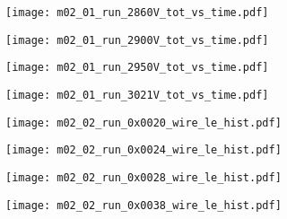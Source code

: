 \documentclass[11pt, ngerman, fleqn, DIV=15, headinclude, BCOR=2cm]{scrreprt}
\begin{document}
\begin{appendix}
	\begin{figure}
		\centering
	\begin{subfigure}[a]{0.45 \textwidth}
		\texttt{[image: m02\_01\_run\_2860V\_tot\_vs\_time.pdf]}
		\caption{%
		}
		\label{fig:m02_01_run_2860V_tot_vs_time}
	\end{subfigure}
	\begin{subfigure}[a]{0.45 \textwidth}
		\texttt{[image: m02\_01\_run\_2900V\_tot\_vs\_time.pdf]}
		\caption{%
		}
		\label{fig:m02_01_run_2900V_tot_vs_time}
	\end{subfigure}
	\begin{subfigure}[a]{0.45 \textwidth}
		\texttt{[image: m02\_01\_run\_2950V\_tot\_vs\_time.pdf]}
		\caption{%
		}
		\label{fig:m02_01_run_2950V_tot_vs_time}
	\end{subfigure}
	\begin{subfigure}[a]{0.45 \textwidth}
		\texttt{[image: m02\_01\_run\_3021V\_tot\_vs\_time.pdf]}
		\caption{%
		}
		\label{fig:m02_01_run_3021V_tot_vs_time}
	\end{subfigure}
	\caption{%
	}
	\label{fig:m02_01_tot_vs_time}
	\end{figure}

	\clearpage



	\begin{figure}
		\centering
	\begin{subfigure}[a]{0.45 \textwidth}
		\texttt{[image: m02\_02\_run\_0x0020\_wire\_le\_hist.pdf]}
		\caption{%
		}
		\label{fig:m02_02_run_0x0020_wire_le_hist}
	\end{subfigure}
	\begin{subfigure}[a]{0.45 \textwidth}
		\texttt{[image: m02\_02\_run\_0x0024\_wire\_le\_hist.pdf]}
		\caption{%
		}
		\label{fig:m02_02_run_0x0024_wire_le_hist}
	\end{subfigure}
	\begin{subfigure}[a]{0.45 \textwidth}
		\texttt{[image: m02\_02\_run\_0x0028\_wire\_le\_hist.pdf]}
		\caption{%
		}
		\label{fig:m02_02_run_0x0028_wire_le_hist}
	\end{subfigure}
	\begin{subfigure}[a]{0.45 \textwidth}
		\texttt{[image: m02\_02\_run\_0x0038\_wire\_le\_hist.pdf]}
		\caption{%
		}
		\label{fig:m02_02_run_0x0038_wire_le_hist}
	\end{subfigure}
	\caption{%
	}
	\label{fig:m02_02_wire_le_hist}
	\end{figure}



\end{appendix}
\end{document}
